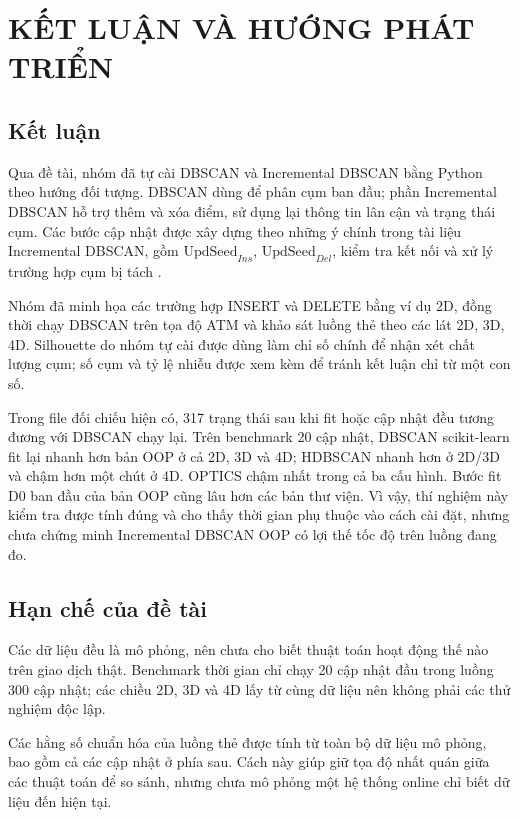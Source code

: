 \chapter{KẾT LUẬN VÀ HƯỚNG PHÁT TRIỂN}

\section{Kết luận}

Qua đề tài, nhóm đã tự cài DBSCAN và Incremental DBSCAN bằng Python theo hướng đối tượng. DBSCAN dùng để phân cụm ban đầu; phần Incremental DBSCAN hỗ trợ thêm và xóa điểm, sử dụng lại thông tin lân cận và trạng thái cụm. Các bước cập nhật được xây dựng theo những ý chính trong tài liệu Incremental DBSCAN, gồm \(\mathrm{UpdSeed}_{Ins}\), \(\mathrm{UpdSeed}_{Del}\), kiểm tra kết nối và xử lý trường hợp cụm bị tách \parencite{ester1998incrementaldbscan}.

Nhóm đã minh họa các trường hợp INSERT và DELETE bằng ví dụ 2D, đồng thời chạy DBSCAN trên tọa độ ATM và khảo sát luồng thẻ theo các lát 2D, 3D, 4D. Silhouette do nhóm tự cài được dùng làm chỉ số chính để nhận xét chất lượng cụm; số cụm và tỷ lệ nhiễu được xem kèm để tránh kết luận chỉ từ một con số.

Trong file đối chiếu hiện có, 317 trạng thái sau khi fit hoặc cập nhật đều tương đương với DBSCAN chạy lại. Trên benchmark 20 cập nhật, DBSCAN scikit-learn fit lại nhanh hơn bản OOP ở cả 2D, 3D và 4D; HDBSCAN nhanh hơn ở 2D/3D và chậm hơn một chút ở 4D. OPTICS chậm nhất trong cả ba cấu hình. Bước fit D0 ban đầu của bản OOP cũng lâu hơn các bản thư viện. Vì vậy, thí nghiệm này kiểm tra được tính đúng và cho thấy thời gian phụ thuộc vào cách cài đặt, nhưng chưa chứng minh Incremental DBSCAN OOP có lợi thế tốc độ trên luồng đang đo.

\section{Hạn chế của đề tài}

Các dữ liệu đều là mô phỏng, nên chưa cho biết thuật toán hoạt động thế nào trên giao dịch thật. Benchmark thời gian chỉ chạy 20 cập nhật đầu trong luồng 300 cập nhật; các chiều 2D, 3D và 4D lấy từ cùng dữ liệu nên không phải các thử nghiệm độc lập.

Các hằng số chuẩn hóa của luồng thẻ được tính từ toàn bộ dữ liệu mô phỏng, bao gồm cả các cập nhật ở phía sau. Cách này giúp giữ tọa độ nhất quán giữa các thuật toán để so sánh, nhưng chưa mô phỏng một hệ thống online chỉ biết dữ liệu đến hiện tại.

